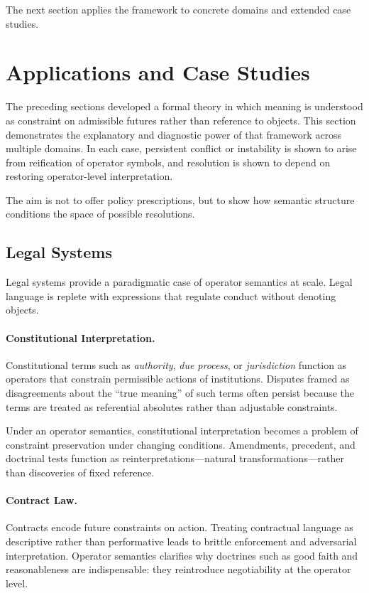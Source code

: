 \documentclass[11pt]{article}
\begin{document}
The next section applies the framework to concrete domains and extended case
studies.

\section{Applications and Case Studies}

The preceding sections developed a formal theory in which meaning is understood as
constraint on admissible futures rather than reference to objects. This section
demonstrates the explanatory and diagnostic power of that framework across
multiple domains. In each case, persistent conflict or instability is shown to
arise from reification of operator symbols, and resolution is shown to depend on
restoring operator-level interpretation.

The aim is not to offer policy prescriptions, but to show how semantic structure
conditions the space of possible resolutions.

\subsection{Legal Systems}

Legal systems provide a paradigmatic case of operator semantics at scale. Legal
language is replete with expressions that regulate conduct without denoting
objects.

\paragraph{Constitutional Interpretation.}
Constitutional terms such as \emph{authority}, \emph{due process}, or
\emph{jurisdiction} function as operators that constrain permissible actions of
institutions. Disputes framed as disagreements about the “true meaning” of such
terms often persist because the terms are treated as referential absolutes rather
than adjustable constraints.

Under an operator semantics, constitutional interpretation becomes a problem of
constraint preservation under changing conditions. Amendments, precedent, and
doctrinal tests function as reinterpretations—natural transformations—rather than
discoveries of fixed reference.

\paragraph{Contract Law.}
Contracts encode future constraints on action. Treating contractual language as
descriptive rather than performative leads to brittle enforcement and adversarial
interpretation. Operator semantics clarifies why doctrines such as good faith and
reasonableness are indispensable: they reintroduce negotiability at the operator
level.
\end{document}
